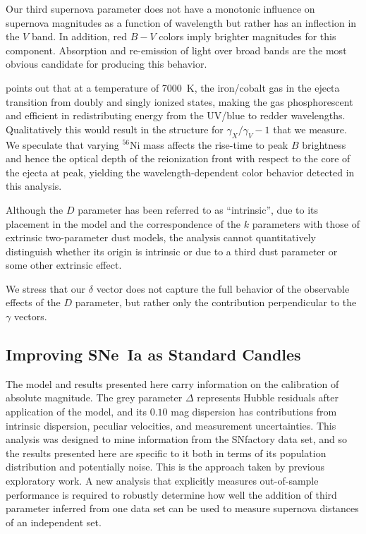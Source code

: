 \documentclass{aastex61}   	%
\begin{document}
Our third supernova parameter does not have a monotonic influence on supernova magnitudes as a function
of wavelength but rather has an inflection in the $V$ band.  In addition, red $B-V$ colors imply brighter magnitudes
for this component.  Absorption and re-emission of light
over broad bands are the most obvious candidate for producing this behavior.

\citet{2006ApJ...649..939K} points out that at a temperature of 7000~K, the iron/cobalt gas in the ejecta transition
from doubly and singly ionized states, making the gas phosphorescent and efficient in redistributing energy from the UV/blue to redder
wavelengths.  Qualitatively this would result in the structure for $\gamma_X/\gamma_V-1$ that we measure.
We speculate that varying $^{56}$Ni mass affects the rise-time to peak $B$ brightness and hence the optical depth
of the reionization front with respect to the core of the ejecta at peak, yielding the wavelength-dependent color behavior
detected in this analysis.



Although the $D$ parameter has been referred to as ``intrinsic'', due to its placement in the model and the correspondence
of the $k$ parameters with those of extrinsic two-parameter dust models, the analysis cannot quantitatively distinguish
whether its origin is intrinsic or due to a third dust parameter or some other extrinsic effect.

We stress that our $\delta$ vector does not capture the full behavior of the observable effects of the $D$ parameter, but rather only
the contribution perpendicular to the $\gamma$ vectors.

\subsection{Improving SNe~Ia as Standard Candles}
The model and results presented here
carry information on the calibration of absolute magnitude.  The grey parameter $\Delta$ represents Hubble residuals after
application of the model, and its  $0.10$ mag dispersion has contributions from intrinsic dispersion, peculiar velocities, and
measurement uncertainties.
This analysis was designed to mine information from the SNfactory data set, and so the results presented here
are specific to it both in terms of its population distribution and potentially noise.  This is the approach taken by previous
exploratory work.
A new analysis that explicitly measures out-of-sample performance is required to robustly determine how
well the addition of third parameter inferred from one data set can be used to measure supernova distances
of an independent set.
\end{document}
